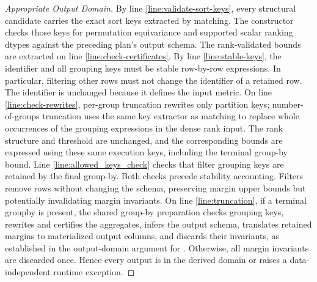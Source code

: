 \documentclass{article}
\begin{document}
\begin{proof}[Appropriate Output Domain]
    By line \ref{line:validate-sort-keys}, every structural candidate
    carries the exact sort keys extracted by matching. The constructor
    checks those keys for permutation equivariance and supported scalar
    ranking dtypes against the preceding plan's output schema.
    The rank-validated bounds are extracted on line \ref{line:check-certificates}.
    By line \ref{line:stable-keys},
    the identifier and all grouping keys must be stable row-by-row expressions.
    In particular, filtering other rows must not change the identifier of a retained row.
    The identifier is unchanged because it defines the input metric.
    On line \ref{line:check-rewrites}, per-group truncation rewrites only partition keys;
    number-of-groups truncation uses the same key extractor as matching to replace
    whole occurrences of the grouping expressions in the dense rank input.
    The rank structure and threshold are unchanged, and the corresponding bounds
    are expressed using these same execution keys, including the terminal group-by bound.
    Line \ref{line:allowed_keys_check} checks that filter grouping keys are retained by the final group-by.
    Both checks precede stability accounting.
    Filters remove rows without changing the schema, preserving margin upper
    bounds but potentially invalidating margin invariants.
    On line \ref{line:truncation}, if a terminal groupby is present, the shared
    group-by preparation checks grouping keys, rewrites and certifies
    the aggregates, infers the output schema, translates retained margins to
    materialized output columns, and discards their invariants, as established in
    the output-domain argument for
    .
    Otherwise, all margin invariants are discarded once.
    Hence every output is in the derived domain or raises a data-independent runtime exception.
\end{proof}
\end{document}
